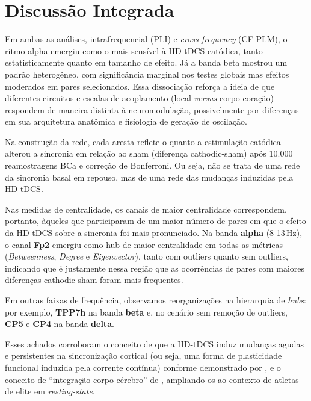 \section{Discussão Integrada}
Em ambas as análises, intrafrequencial (PLI) e \textit{cross-frequency} (CF-PLM), o ritmo alpha emergiu como o mais sensível à HD-tDCS catódica, tanto estatisticamente quanto em tamanho de efeito. Já a banda beta mostrou um padrão heterogêneo, com significância marginal nos testes globais mas efeitos moderados em pares selecionados. Essa dissociação reforça a ideia de que diferentes circuitos e escalas de acoplamento (local \textit{versus} corpo-coração) respondem de maneira distinta à neuromodulação, possivelmente por diferenças em sua arquitetura anatômica e fisiologia de geração de oscilação.

Na construção da rede, cada aresta reflete o quanto a estimulação catódica alterou a sincronia em relação ao sham (diferença cathodic-sham) após 10.000 reamostragens BCa e correção de Bonferroni. Ou seja, não se trata de uma rede da sincronia basal em repouso, mas de uma rede das mudanças induzidas pela HD-tDCS.

Nas medidas de centralidade, os canais de maior centralidade correspondem, portanto, àqueles que participaram de um maior número de pares em que o efeito da HD-tDCS sobre a sincronia foi mais pronunciado. Na banda \textbf{alpha} (8-13 Hz), o canal \textbf{Fp2} emergiu como hub de maior centralidade em todas as métricas (\textit{Betweenness}, \textit{Degree} e \textit{Eigenvector}), tanto com outliers quanto sem outliers, indicando que é justamente nessa região que as ocorrências de pares com maiores diferenças cathodic-sham foram mais frequentes.

Em outras faixas de frequência, observamos reorganizações na hierarquia de \textit{hubs}: por exemplo, \textbf{TPP7h} na banda \textbf{beta} e, no cenário sem remoção de outliers, \textbf{CP5} e \textbf{CP4} na banda \textbf{delta}.

Esses achados corroboram o conceito de que a HD-tDCS induz mudanças agudas e persistentes na sincronização cortical (ou seja, uma forma de plasticidade funcional induzida pela corrente contínua) conforme demonstrado por , e o conceito de ``integração corpo-cérebro'' de , ampliando-os ao contexto de atletas de elite em \emph{resting-state}.

